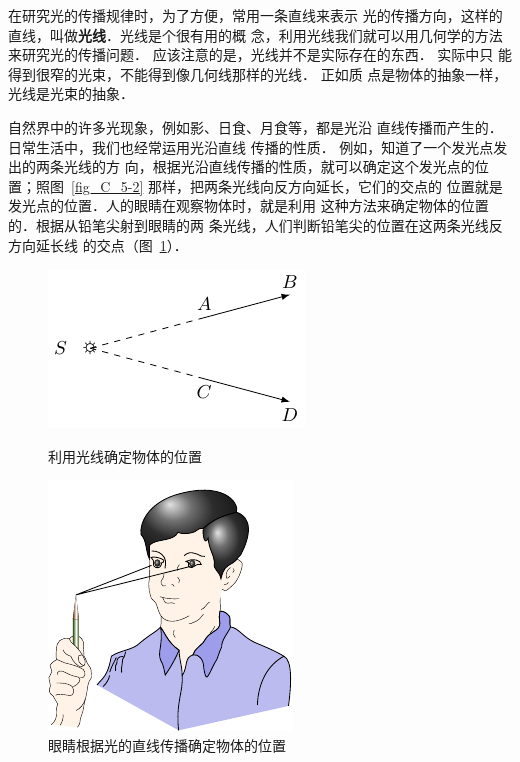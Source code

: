在研究光的传播规律时，为了方便，常用一条直线来表示
光的传播方向，这样的直线，叫做\textbf{光线}．光线是个很有用的概
念，利用光线我们就可以用几何学的方法来研究光的传播问题．
应该注意的是，光线并不是实际存在的东西．
实际中只
能得到很窄的光束，不能得到像几何线那样的光线．
正如质
点是物体的抽象一样，光线是光束的抽象．

自然界中的许多光现象，例如影、日食、月食等，都是光沿
直线传播而产生的．日常生活中，我们也经常运用光沿直线
传播的性质．
例如，知道了一个发光点发出的两条光线的方
向，根据光沿直线传播的性质，就可以确定这个发光点的位
置；照图~\ref{fig_C_5-2} 那样，把两条光线向反方向延长，它们的交点的
位置就是发光点的位置．人的眼睛在观察物体时，就是利用
这种方法来确定物体的位置的．根据从铅笔尖射到眼睛的两
条光线，人们判断铅笔尖的位置在这两条光线反方向延长线
的交点（图~\ref{fig_C_5-3}）．
\begin{figure}[htbp]
    \centering
    \begin{minipage}[t]{0.4\textwidth}
        \centering
        \includegraphics{fig/C/5-2.pdf}
        \caption{利用光线确定物体的位置}\label{fig_C_5-2}
    \end{minipage}
    \hfill
    \begin{minipage}[t]{0.55\textwidth}
        \centering
        \includegraphics{fig/C/5-3.pdf}
        \caption{眼睛根据光的直线传播确定物体的位置}\label{fig_C_5-3}
    \end{minipage}
\end{figure}

